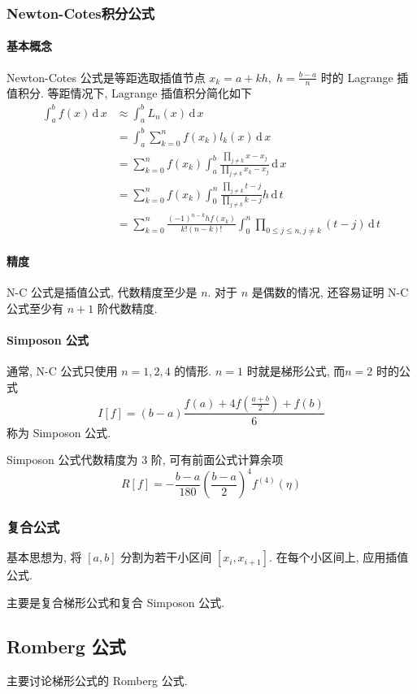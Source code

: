\documentclass{ctexart}
\newcommand{\ud}{\,\mathrm{d}\,}
\begin{document}
\subsubsection{Newton-Cotes积分公式}
\paragraph{基本概念}
    Newton-Cotes 公式是等距选取插值节点 $x_k = a + kh,\;h = \frac{b-a}{n}$ 时的
    Lagrange 插值积分. 等距情况下, Lagrange 插值积分简化如下
    \begin{align*}
        \int_a^b f(x) \ud x &\approx \int_a^b L_n(x) \ud x\\
            &= \int_a^b \sum_{k=0}^n f(x_k) l_k(x) \ud x\\
            &= \sum_{k=0}^n f(x_k) \int_a^b \frac{\prod_{j \neq k} x - x_j}{\prod_{j \neq k} x_k - x_j} \ud x\\
            &= \sum_{k=0}^n f(x_k) \int_0^n \frac{\prod_{j \neq k} t - j}{\prod_{j \neq k} k - j} h \ud t\\
            &= \sum_{k=0}^n \frac{(-1)^{n-k} h f(x_k)}{k! (n-k)!} \int_0^n \prod_{0\le j\le n, j\neq k} (t-j) \ud t
    \end{align*}
\paragraph{精度}
    N-C 公式是插值公式, 代数精度至少是 $n$.
    对于 $n$ 是偶数的情况, 还容易证明 N-C 公式至少有 $n+1$ 阶代数精度.
    \par
\paragraph{Simposon 公式}
    通常, N-C 公式只使用 $n=1,2,4$ 的情形. 
    $n=1$ 时就是梯形公式, 而$n=2$ 时的公式 \[
        I[f] = (b-a) \frac{f(a) + 4 f\left(\frac{a+b}{2}\right) + f(b) }{6}
        \]
    称为 Simposon 公式.\par
    Simposon 公式代数精度为 3 阶, 可有前面公式计算余项 \[
        R[f] = -\frac{b-a}{180} \left(\frac{b-a}{2}\right)^4 f^{(4)}(\eta)\]
\subsubsection{复合公式}
    基本思想为, 将 $[a,b]$ 分割为若干小区间 $[x_i, x_{i+1}]$.
    在每个小区间上, 应用插值公式.\par
    主要是复合梯形公式和复合 Simposon 公式.

\subsection{Romberg 公式}
    主要讨论梯形公式的 Romberg 公式.
\end{document}
